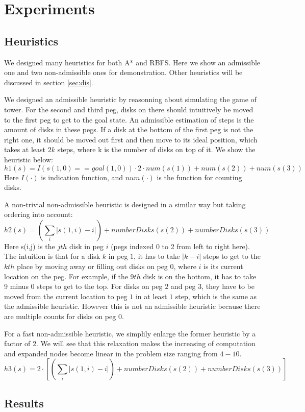 \section{Experiments}\label{sec:exp}

\subsection{Heuristics}
We designed many heuristics for both A* and RBFS. Here we show an admissible one and two non-admissible ones for demonstration. Other heuristics will be discussed in section \ref{sec:dis}.

We designed an admissible heuristic by reasonning about simulating the game of tower. For the second and third peg, disks on there should intuitively be moved to the first peg to get to the goal state. An admissible estimation of steps is the amount of disks in these pegs. If a disk at the bottom of the first peg is not the right one, it should be moved out first and then move to its ideal position, which takes at least $2k$ steps, where k is the number of disks on top of it. We show the heuristic below:
\[
h1(s) = I(s(1,0)==goal(1,0))\cdot 2 \cdot num(s(1)) + num(s(2)) + num(s(3))
\]
Here $I(\cdot)$ is indication function, and $num(\cdot)$ is the function for counting disks.

A non-trivial non-admissible heuristic is designed in a similar way but taking ordering into account:
\[
h2(s) = (\sum_i |s(1,i)-i| ) + numberDisks(s(2)) + numberDisks(s(3))
\]
Here s(i,j) is the $jth$ disk in peg $i$ (pegs indexed 0 to 2 from left to right here). The intuition is that for a disk $k$ in peg $1$, it has to take $|k-i|$ steps to get to the $kth$ place by moving away or filling out disks on peg $0$, where $i$ is its current location on the peg. For example, if the $9th$ disk is on the bottom, it has to take 9 minus 0 steps to get to the top. For disks on peg $2$ and peg $3$, they have to be moved from the current location to peg $1$ in at least $1$ step, which is the same as the admissible heuristic. However this is not an admissible heuristic because there are multiple counts for disks on peg $0$. 

For a fast non-admissible heuristic, we simplily enlarge the former heuristic by a factor of $2$. We will see that this relaxation makes the increasing of computation and expanded nodes become linear in the problem size ranging from $4-10$.
\[
h3(s) = 2 \cdot [(\sum_i |s(1,i)-i| ) + numberDisks(s(2)) + numberDisks(s(3))]
\]
\subsection{Results}

